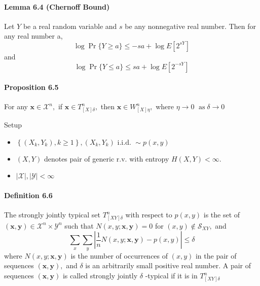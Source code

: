 \documentclass[8pt]{article}
\begin{document}
\paragraph{Lemma 6.4 (Chernoff Bound)} Let $Y$ be a real random variable and $s$ be any nonnegative real number. Then for any real number a,
$$
\log \operatorname{Pr}\{Y \geq a\} \leq-s a+\log E\left[2^{s Y}\right]
$$
and
$$
\log \operatorname{Pr}\{Y \leq a\} \leq s a+\log E\left[2^{-s Y}\right]
$$

\begin{tcolorbox}
\paragraph{Proposition 6.5} For any $\mathbf{x} \in \mathcal{X}^{n},$ if $\mathbf{x} \in T_{[X] \delta}^{n},$ then $\mathbf{x} \in W_{[X] \eta}^{n},$ where $\eta \rightarrow 0$
$\operatorname{as} \delta \rightarrow 0$\\
\end{tcolorbox}

\noindent Setup
\begin{itemize}
	\item $\left\{\left(X_{k}, Y_{k}\right), k \geq 1\right\},\left(X_{k}, Y_{k}\right) \text { i.i.d. } \sim p(x, y)$
	\item $(X, Y)$ denotes pair of generic $\mathrm{r} . \mathrm{v}$. with entropy $H(X, Y)<\infty$.
	\item $|\mathcal{X}|,|\mathcal{Y}|<\infty$
\end{itemize}

\begin{tcolorbox}
\paragraph{Definition 6.6} The strongly jointly typical set $T_{[X Y] \delta}^{n}$ with respect to $p(x, y)$ is the set of $(\mathbf{x}, \mathbf{y}) \in \mathcal{X}^{n} \times \mathcal{Y}^{n}$ such that $N(x, y ; \mathbf{x}, \mathbf{y})=0$ for $(x, y) \notin \mathcal{S}_{X Y},$ and
$$
\sum_{x} \sum_{y}\left|\frac{1}{n} N(x, y ; \mathbf{x}, \mathbf{y})-p(x, y)\right| \leq \delta
$$
where $N(x, y ; \mathbf{x}, \mathbf{y})$ is the number of occurrences of $(x, y)$ in the pair of sequences $(\mathbf{x}, \mathbf{y}),$ and $\delta$ is an arbitrarily small positive real number. A pair of sequences $(\mathbf{x}, \mathbf{y})$ is called strongly jointly $\delta$ -typical if it is in $T_{[X Y] \delta}^{n}$
\end{tcolorbox}
\end{document}
